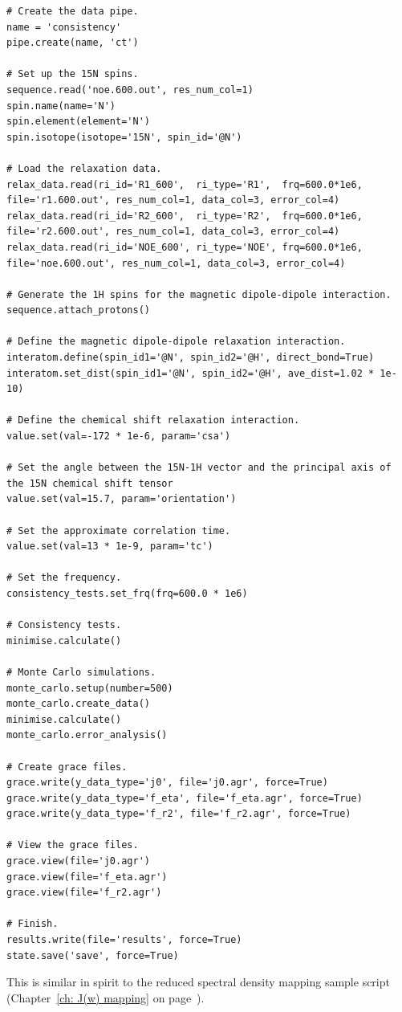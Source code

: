 \begin{lstlisting}
# Create the data pipe.
name = 'consistency'
pipe.create(name, 'ct')

# Set up the 15N spins.
sequence.read('noe.600.out', res_num_col=1)
spin.name(name='N')
spin.element(element='N')
spin.isotope(isotope='15N', spin_id='@N')

# Load the relaxation data.
relax_data.read(ri_id='R1_600',  ri_type='R1',  frq=600.0*1e6, file='r1.600.out', res_num_col=1, data_col=3, error_col=4)
relax_data.read(ri_id='R2_600',  ri_type='R2',  frq=600.0*1e6, file='r2.600.out', res_num_col=1, data_col=3, error_col=4)
relax_data.read(ri_id='NOE_600', ri_type='NOE', frq=600.0*1e6, file='noe.600.out', res_num_col=1, data_col=3, error_col=4)

# Generate the 1H spins for the magnetic dipole-dipole interaction.
sequence.attach_protons()

# Define the magnetic dipole-dipole relaxation interaction.
interatom.define(spin_id1='@N', spin_id2='@H', direct_bond=True)
interatom.set_dist(spin_id1='@N', spin_id2='@H', ave_dist=1.02 * 1e-10)

# Define the chemical shift relaxation interaction.
value.set(val=-172 * 1e-6, param='csa')

# Set the angle between the 15N-1H vector and the principal axis of the 15N chemical shift tensor
value.set(val=15.7, param='orientation')

# Set the approximate correlation time.
value.set(val=13 * 1e-9, param='tc')

# Set the frequency.
consistency_tests.set_frq(frq=600.0 * 1e6)

# Consistency tests.
minimise.calculate()

# Monte Carlo simulations.
monte_carlo.setup(number=500)
monte_carlo.create_data()
minimise.calculate()
monte_carlo.error_analysis()

# Create grace files.
grace.write(y_data_type='j0', file='j0.agr', force=True)
grace.write(y_data_type='f_eta', file='f_eta.agr', force=True)
grace.write(y_data_type='f_r2', file='f_r2.agr', force=True)

# View the grace files.
grace.view(file='j0.agr')
grace.view(file='f_eta.agr')
grace.view(file='f_r2.agr')

# Finish.
results.write(file='results', force=True)
state.save('save', force=True)
\end{lstlisting}

This is similar in spirit to the reduced spectral density mapping sample script (Chapter~\ref{ch: J(w) mapping} on page~\pageref{ch: J(w) mapping}).


